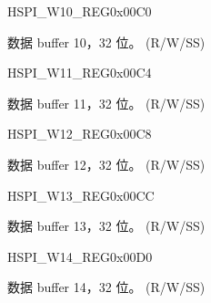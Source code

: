 \begin{register}{H}{SPI\_W10\_REG}{0x00C0}\label{regdesc:SPIW10REG}
%
\regnewline%
\begin{regdesc}\begin{reglist}
\label{fielddesc:SPIBUF10}\item [SPI\_BUF10] 数据 buffer 10，32 位。 (R/W/SS)
\end{reglist}\end{regdesc}
\end{register}


\begin{register}{H}{SPI\_W11\_REG}{0x00C4}\label{regdesc:SPIW11REG}
%
\regnewline%
\begin{regdesc}\begin{reglist}
\label{fielddesc:SPIBUF11}\item [SPI\_BUF11] 数据 buffer 11，32 位。 (R/W/SS)
\end{reglist}\end{regdesc}
\end{register}


\begin{register}{H}{SPI\_W12\_REG}{0x00C8}\label{regdesc:SPIW12REG}
%
\regnewline%
\begin{regdesc}\begin{reglist}
\label{fielddesc:SPIBUF12}\item [SPI\_BUF12] 数据 buffer 12，32 位。 (R/W/SS)
\end{reglist}\end{regdesc}
\end{register}


\begin{register}{H}{SPI\_W13\_REG}{0x00CC}\label{regdesc:SPIW13REG}
%
\regnewline%
\begin{regdesc}\begin{reglist}
\label{fielddesc:SPIBUF13}\item [SPI\_BUF13] 数据 buffer 13，32 位。 (R/W/SS)
\end{reglist}\end{regdesc}
\end{register}


\begin{register}{H}{SPI\_W14\_REG}{0x00D0}\label{regdesc:SPIW14REG}
%
\regnewline%
\begin{regdesc}\begin{reglist}
\label{fielddesc:SPIBUF14}\item [SPI\_BUF14] 数据 buffer 14，32 位。 (R/W/SS)
\end{reglist}\end{regdesc}
\end{register}


